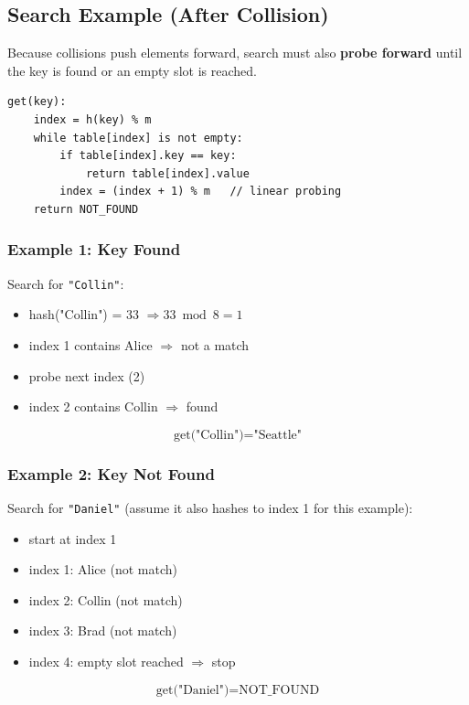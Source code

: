 \subsection{Search Example (After Collision)}

Because collisions push elements forward, search must also \textbf{probe forward} until the key is found or an empty slot is reached.

\begin{verbatim}
get(key):
    index = h(key) % m
    while table[index] is not empty:
        if table[index].key == key:
            return table[index].value
        index = (index + 1) % m   // linear probing
    return NOT_FOUND
\end{verbatim}

\subsubsection*{Example 1: Key Found}
Search for \texttt{"Collin"}:

\begin{itemize}
  \item hash("Collin") = 33 $\Rightarrow 33 \bmod 8 = 1$
  \item index 1 contains Alice $\Rightarrow$ not a match
  \item probe next index (2)
  \item index 2 contains Collin $\Rightarrow$ found
\end{itemize}

\[
\text{get("Collin")} = \text{"Seattle"}
\]

\subsubsection*{Example 2: Key Not Found}
Search for \texttt{"Daniel"} (assume it also hashes to index 1 for this example):

\begin{itemize}
  \item start at index 1
  \item index 1: Alice (not match)
  \item index 2: Collin (not match)
  \item index 3: Brad (not match)
  \item index 4: empty slot reached $\Rightarrow$ stop
\end{itemize}

\[
\text{get("Daniel")} = \text{NOT\_FOUND}
\]

